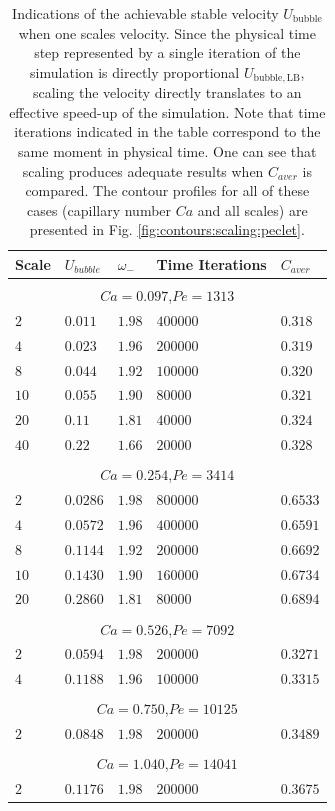 \documentclass{article}
\newcommand{\ububble}{U_{\mathrm{bubble}}}
\newcommand{\omegaminus}{\omega_{-}}
\begin{document}
\begin{table}[htb!]
\begin{tabularx}{\textwidth}{|X|X|X|X|X|}
\hline
Scale&$U_{bubble}$&$\omegaminus$&Time Iterations&$C_{aver}$\\
\hline
\multicolumn{5}{c}{}\\
\multicolumn{5}{c}{$Ca=0.097$,$Pe=1313$}\\
\hline
$2$ &$0.011$&$1.98$&$400000$&$0.318$\\
$4$ &$0.023$&$1.96$&$200000$&$0.319$\\
$8$ &$0.044$&$1.92$&$100000$&$0.320$\\
$10$&$0.055$&$1.90$&$80000$ &$0.321$\\
$20$&$0.11 $&$1.81$&$40000$ &$0.324$\\
$40$&$0.22 $&$1.66$&$20000$ &$0.328$\\
\hline
\multicolumn{5}{c}{}\\
\multicolumn{5}{c}{$Ca=0.254$,$Pe=3414$}\\
\hline
$2$& $0.0286$&$1.98$&$800000$&$0.6533$\\
$4$& $0.0572$&$1.96$&$400000$&$0.6591$\\
$8$& $0.1144$&$1.92$&$200000$&$0.6692$\\
$10$&$0.1430$&$1.90$&$160000$&$0.6734$\\
$20$&$0.2860$&$1.81$&$80000$ &$0.6894$\\
\hline
\multicolumn{5}{c}{}\\
\multicolumn{5}{c}{$Ca=0.526$,$Pe=7092$}\\
\hline
$2$&$0.0594$&$1.98$&$200000$&$0.3271$\\
$4$&$0.1188$&$1.96$&$100000$&$0.3315$\\
\hline
\multicolumn{5}{c}{}\\
\multicolumn{5}{c}{$Ca=0.750$,$Pe=10125$}\\
\hline
$2$&$0.0848$&$1.98$&$200000$&$0.3489$\\
\hline
\multicolumn{5}{c}{}\\
\multicolumn{5}{c}{$Ca=1.040$,$Pe=14041$}\\
\hline
$2$&$0.1176$&$1.98$&$200000$&$0.3675$\\
\hline
\end{tabularx}
\caption{Indications of the achievable stable velocity $\ububble$ when one scales velocity. Since
the physical time step represented by a single iteration of the simulation is directly proportional
$U_{\mathrm{bubble,LB}}$, scaling the velocity directly translates to an effective speed-up of the simulation.
Note that time iterations
indicated in the table correspond to the same moment in physical time. One can see that
scaling produces adequate results when $C_{aver}$ is compared.  
The contour
profiles for all of these cases (capillary number $Ca$ and all scales) are presented in Fig.
\ref{fig:contours:scaling:peclet}.
\label{table:scaling:peclet}}
\end{table}
\end{document}
